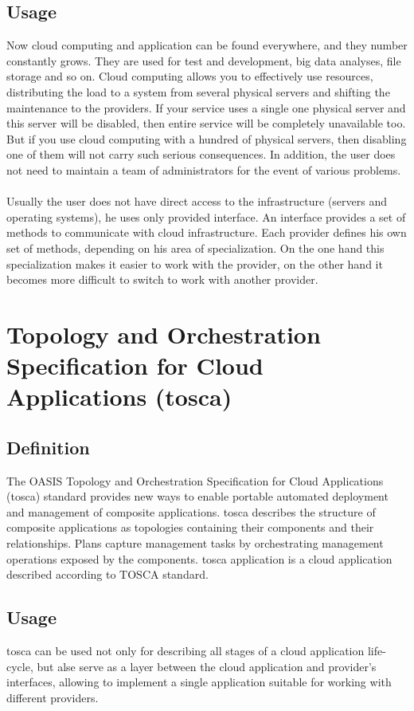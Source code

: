 \subsection{Usage}
Now cloud computing and application can be found everywhere, and they number constantly grows. \cite*{cloud_stat}
They are used for test and development, big data analyses, file storage and so on.
Cloud computing allows you to effectively use resources, distributing the load to a system from several physical servers and shifting the maintenance to the providers. 
If your service uses a single one physical server and this server will be disabled, then entire service will be completely unavailable too.
But if you use cloud computing with a hundred of physical servers, then disabling one of them will not carry such serious consequences.
In addition, the user does not need to maintain a team of administrators for the event of various problems.\\\\ 
Usually the user does not have direct access to the infrastructure (servers and operating systems), he uses only provided interface.
An interface provides a set of methods to communicate with cloud infrastructure. 
Each provider defines his own set of methods, depending on his area of specialization. 
On the one hand this specialization makes it easier to work with the provider, on the other hand it becomes more difficult to switch to work with another provider.

\section{Topology and Orchestration Specification for Cloud	Applications (\gls{tosca})} \label{sec:tosca}
\subsection*{Definition}
The OASIS \cite{oasis} Topology and Orchestration Specification for Cloud Applications (\gls{tosca}) standard provides new ways to enable portable automated deployment and management of composite applications.
\gls{tosca} describes the structure of composite applications as topologies containing their components and their relationships.
Plans capture management tasks by orchestrating management operations exposed by the components. \cite*{INBOOK-2014-01}
\gls{tosca} application is a cloud application described according to TOSCA standard.
\subsection*{Usage}
\gls{tosca} can be used not only for describing all stages of a cloud application life-cycle, but alse serve as a layer between the cloud application and provider's interfaces, allowing to implement a single application suitable for working with different providers. 
